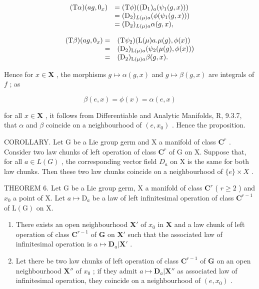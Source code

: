 \[
\begin{array}{r l} (\mathrm{T} \alpha) (a g, 0 _ {x}) & = (\mathrm{T} \phi) ((\mathrm{D} _ {1}) _ {a} (\psi_ {1} (g, x))) \\ & = (\mathrm{D} _ {2}) _ {L (\mu) a} (\phi (\psi_ {1} (g, x))) \\ & = (\mathrm{D} _ {2}) _ {L (\mu) a} \alpha (g, x), \end{array}
\]

\[
\begin{array}{r l} (\mathrm{T} \beta) (a g, 0 _ {x}) = & (\mathrm{T} \psi_ {2}) (\mathrm{L} (\mu) a. \mu (g), \phi (x)) \\ = & (\mathrm{D} _ {2}) _ {\mathrm{L} (\mu) a} (\psi_ {2} (\mu (g), \phi (x))) \\ = & (\mathrm{D} _ {2}) _ {\mathrm{L} (\mu) a} \beta (g, x). \end{array}
\]

Hence for \(x \in \mathbf{X}\) , the morphisms \(g \mapsto \alpha(g, x)\) and \(g \mapsto \beta(g, x)\) are integrals of \(f\) ; as

\[
\beta (e, x) = \phi (x) = \alpha (e, x)
\]

for all \(x \in \mathbf{X}\) , it follows from Differentiable and Analytic Manifolds, R, 9.3.7, that \(\alpha\) and \(\beta\) coincide on a neighbourhood of \((e, x_0)\) . Hence the proposition.

COROLLARY. Let G be a Lie group germ and X a manifold of class \(\mathbf{C}^{r}\) . Consider two law chunks of left operation of class \(\mathbf{C}^{r}\) of G on X. Suppose that, for all \(a \in L(G)\) , the corresponding vector field \(D_{a}\) on X is the same for both law chunks. Then these two law chunks coincide on a neighbourhood of \(\{e\} \times X\) .

THEOREM 6. Let G be a Lie group germ, X a manifold of class \(\mathbf{C}^r\) ( \(r \geqslant 2\) ) and \(x_0\) a point of X. Let \(a \mapsto \mathrm{D}_a\) be a law of left infinitesimal operation of class \(\mathbf{C}^{r-1}\) of \(\mathrm{L(G)}\) on X.

\begin{enumerate}
\def\labelenumi{(\roman{enumi})}
\item
  There exists an open neighbourhood \(\mathbf{X}'\) of \(x_0\) in \(\mathbf{X}\) and a law chunk of left operation of class \(\mathbf{C}^{r-1}\) of \(\mathbf{G}\) on \(\mathbf{X}'\) such that the associated law of infinitesimal operation is \(a \mapsto \mathbf{D}_a|\mathbf{X}'\) .
\item
  Let there be two law chunks of left operation of class \(\mathbf{C}^{r-1}\) of \(\mathbf{G}\) on an open neighbourhood \(\mathbf{X}''\) of \(x_0\) ; if they admit \(a \mapsto \mathbf{D}_a|\mathbf{X}''\) as associated law of infinitesimal operation, they coincide on a neighbourhood of \((e, x_0)\) .
\end{enumerate}

